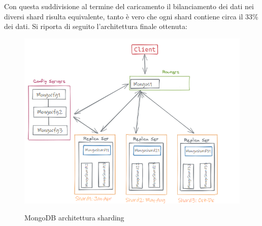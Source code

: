 \documentclass[12pt]{article}
\begin{document}
Con questa suddivisione al termine del caricamento il bilanciamento dei dati nei diversi shard risulta equivalente, tanto è vero che ogni shard contiene circa il 33\% dei dati. Si riporta di seguito l'architettura finale ottenuta:
\begin{figure}[H]
    \begin{center}
      \includegraphics[scale = 0.8]{img/dataMan/sharding-and-replica-sets.png}\\
      \caption{MongoDB architettura sharding}
    \end{center}
\end{figure}
\end{document}
